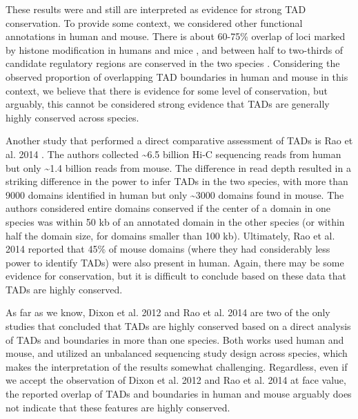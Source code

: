 These results were and still are interpreted as evidence for strong TAD conservation. To provide some context, we considered other functional annotations in human and mouse. There is about 60-75\% overlap of loci marked by histone modification in humans and mice \cite{Woo.2012}, and between half to two-thirds of candidate regulatory regions are conserved in the two species \cite{Yue.2014}. Considering the observed proportion of overlapping TAD boundaries in human and mouse in this context, we believe that there is evidence for some level of conservation, but arguably, this cannot be considered strong evidence that TADs are generally highly conserved across species.

Another study that performed a direct comparative assessment of TADs is Rao et al. 2014 \cite{Rao.2014}. The authors collected \textasciitilde{}6.5 billion Hi-C sequencing reads from human but only \textasciitilde{}1.4 billion reads from mouse. The difference in read depth resulted in a striking difference in the power to infer TADs in the two species, with more than 9000 domains identified in human but only \textasciitilde{}3000 domains found in mouse. The authors considered entire domains conserved if the center of a domain in one species was within 50 kb of an annotated domain in the other species (or within half the domain size, for domains smaller than 100 kb). Ultimately, Rao et al. 2014 reported that 45\% of mouse domains (where they had considerably less power to identify TADs) were also present in human. Again, there may be some evidence for conservation, but it is difficult to conclude based on these data that TADs are highly conserved. 

As far as we know, Dixon et al. 2012 and Rao et al. 2014 are two of the only studies that concluded that TADs are highly conserved based on a direct analysis of TADs and boundaries in more than one species. Both works used human and mouse, and utilized an unbalanced sequencing study design across species, which makes the interpretation of the results somewhat challenging. Regardless, even if we accept the observation of Dixon et al. 2012 and Rao et al. 2014 at face value, the reported overlap of TADs and boundaries in human and mouse arguably does not indicate that these features are highly conserved.


